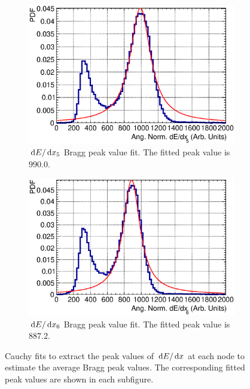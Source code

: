 \begin{figure}[ht]
\begin{subfigure}{\dbfigwid\textwidth}
         \includegraphics[width=\textwidth]{figures/sel/fig54e.eps}
         \caption{$\,\textrm{d}E/\,\textrm{d}x_5$ Bragg peak value fit. The fitted peak value is $990.0$.}
         \label{subfig:dedx4-peak}
    \end{subfigure}
    \begin{subfigure}{\dbfigwid\textwidth}
         \includegraphics[width=\textwidth]{figures/sel/fig54f.eps}
         \caption{$\,\textrm{d}E/\,\textrm{d}x_6$ Bragg peak value fit. The fitted peak value is $887.2$.}
         \label{subfig:dedx5-peak}
    \end{subfigure}
    \caption{Cauchy fits to extract the peak values of $\,\textrm{d}E/\,\textrm{d}x$ at each node to estimate the average Bragg peak values. The corresponding fitted peak values are shown in each subfigure.}
    \label{fig:esc-andedx-peaks}
  \end{figure}

